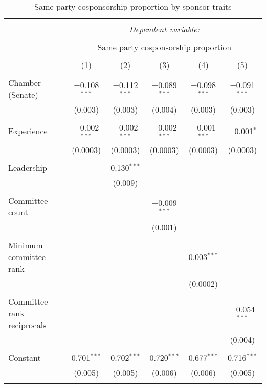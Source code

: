 \documentclass{article}
\begin{document}
  \begin{table}[!htbp] \centering 
    \caption{Same party cosponsorship proportion by sponsor traits} 
    \label{tab:party_prop} 
  \begin{tabular}{@{\extracolsep{5pt}}lccccc} 
  \\[-1.8ex]\hline 
  \hline \\[-1.8ex] 
   & \multicolumn{5}{c}{\textit{Dependent variable:}} \\ 
  \cline{2-6} 
  \\[-1.8ex] & \multicolumn{5}{c}{Same party cosponsorship proportion} \\ 
  \\[-1.8ex] & (1) & (2) & (3) & (4) & (5)\\ 
  \hline \\[-1.8ex] 
   Chamber (Senate) & $-$0.108$^{***}$ & $-$0.112$^{***}$ & $-$0.089$^{***}$ & $-$0.098$^{***}$ & $-$0.091$^{***}$ \\ 
    & (0.003) & (0.003) & (0.004) & (0.003) & (0.003) \\ 
    & & & & & \\ 
   Experience & $-$0.002$^{***}$ & $-$0.002$^{***}$ & $-$0.002$^{***}$ & $-$0.001$^{***}$ & $-$0.001$^{*}$ \\ 
    & (0.0003) & (0.0003) & (0.0003) & (0.0003) & (0.0003) \\ 
    & & & & & \\ 
   Leadership &  & 0.130$^{***}$ &  &  &  \\ 
    &  & (0.009) &  &  &  \\ 
    & & & & & \\ 
   Committee count &  &  & $-$0.009$^{***}$ &  &  \\ 
    &  &  & (0.001) &  &  \\ 
    & & & & & \\ 
   Minimum committee rank &  &  &  & 0.003$^{***}$ &  \\ 
    &  &  &  & (0.0002) &  \\ 
    & & & & & \\ 
   Committee rank reciprocals &  &  &  &  & $-$0.054$^{***}$ \\ 
    &  &  &  &  & (0.004) \\ 
    & & & & & \\ 
   Constant & 0.701$^{***}$ & 0.702$^{***}$ & 0.720$^{***}$ & 0.677$^{***}$ & 0.716$^{***}$ \\ 
    & (0.005) & (0.005) & (0.006) & (0.006) & (0.005) \\ 
    & & & & & \\ 

\end{tabular}
\end{table}
\end{document}
